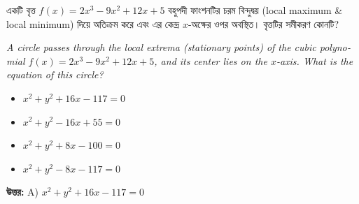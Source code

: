 \documentclass[12pt, a4paper]{article}
\begin{document}
\begin{tcolorbox}[questionbox={প্রশ্ন (Question) 36}]
    \noindent
    একটি বৃত্ত $f(x) = 2x^3 - 9x^2 + 12x + 5$ বহুপদী ফাংশনটির চরম বিন্দুদ্বয় (local maximum \& local minimum) দিয়ে অতিক্রম করে এবং এর কেন্দ্র $x$-অক্ষের ওপর অবস্থিত। বৃত্তটির সমীকরণ কোনটি?
    
    \vspace{0.8em}
    \begin{english}
    \noindent\textit{\color{darkgray}
    A circle passes through the local extrema (stationary points) of the cubic polynomial $f(x) = 2x^3 - 9x^2 + 12x + 5$, and its center lies on the $x$-axis. What is the equation of this circle?
    }
    \end{english}
\end{tcolorbox}

\begin{itemize}[label={}, leftmargin=1cm, itemsep=0.5em]
    \item[\textbf{A)}] $x^2 + y^2 + 16x - 117 = 0$
    \item[\textbf{B)}] $x^2 + y^2 - 16x + 55 = 0$
    \item[\textbf{C)}] $x^2 + y^2 + 8x - 100 = 0$
    \item[\textbf{D)}] $x^2 + y^2 - 8x - 117 = 0$
\end{itemize}

\vspace{0.5em}
\begin{tcolorbox}[answerbox]
    \textbf{\color{success} উত্তর:} A) $x^2 + y^2 + 16x - 117 = 0$
\end{tcolorbox}
\vspace{1em}
\end{document}
